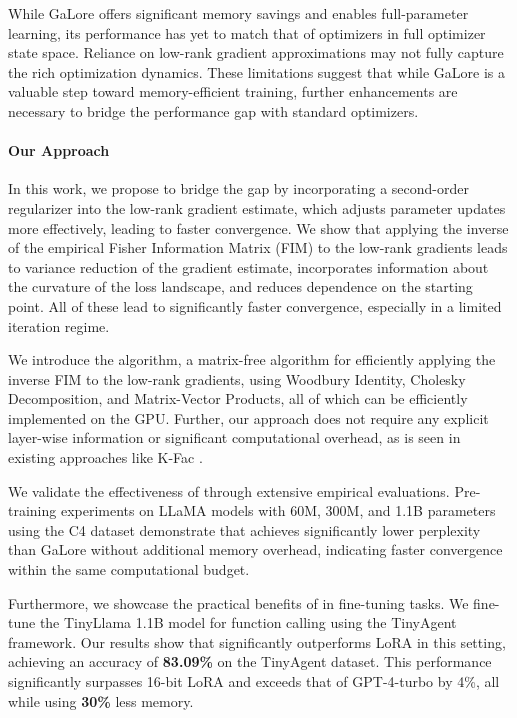 While GaLore offers significant memory savings and enables full-parameter learning, its performance has yet to match that of optimizers in full optimizer state space. Reliance on low-rank gradient approximations may not fully capture the rich optimization dynamics. These limitations suggest that while GaLore is a valuable step toward memory-efficient training, further enhancements are necessary to bridge the performance gap with standard optimizers.

\paragraph{Our Approach}

In this work, we propose to bridge the gap by incorporating a second-order regularizer into the low-rank gradient estimate, which adjusts parameter updates more effectively, leading to faster convergence. We show that applying the inverse of the empirical Fisher Information Matrix (FIM) to the low-rank gradients leads to variance reduction of the gradient estimate, incorporates information about the curvature of the loss landscape, and reduces dependence on the starting point. All of these lead to significantly faster convergence, especially in a limited iteration regime.

We introduce the \textit{\lowrank} algorithm, a matrix-free algorithm for efficiently applying the inverse FIM to the low-rank gradients, using Woodbury Identity, Cholesky Decomposition, and Matrix-Vector Products, all of which can be efficiently implemented on the GPU. Further, our approach does not require any explicit layer-wise information or significant computational overhead, as is seen in existing approaches like K-Fac \citep{martens2015optimizing}.

 We validate the effectiveness of \textit{\lowrank} through extensive empirical evaluations. Pre-training experiments on LLaMA models with 60M, 300M, and 1.1B parameters using the C4 dataset demonstrate that \textit{\lowrank} achieves significantly lower perplexity than GaLore without additional memory overhead, indicating faster convergence within the same computational budget.

 Furthermore, we showcase the practical benefits of \textit{\lowrank} in fine-tuning tasks. We fine-tune the TinyLlama 1.1B model for function calling using the TinyAgent framework. Our results show that \textit{\lowrank} significantly outperforms LoRA in this setting, achieving an accuracy of \textbf{83.09\%} on the TinyAgent dataset. This performance significantly surpasses 16-bit LoRA and exceeds that of GPT-4-turbo by 4\%, all while using \textbf{30\%} less memory.




